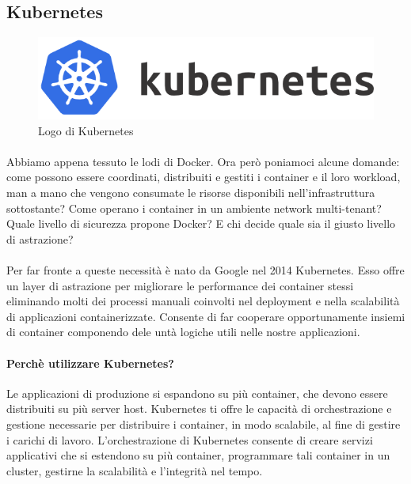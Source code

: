 \subsection{Kubernetes}
\begin{figure}[h!]
	\centering
	\includegraphics[width=\textwidth,keepaspectratio=true]{capitoli/imgs/kubernetes_full.png}
	\caption{Logo di Kubernetes}
\end{figure}

\paragraph{}
Abbiamo appena tessuto le lodi di Docker. Ora però poniamoci alcune domande: come possono essere coordinati, distribuiti e gestiti i container e il loro workload, man a mano che vengono consumate le risorse disponibili nell’infrastruttura sottostante? Come operano i container in un ambiente network multi-tenant? Quale livello di sicurezza propone Docker? E chi decide quale sia il giusto livello di astrazione?

\paragraph{}
Per far fronte a queste necessità è nato da Google nel 2014 Kubernetes. Esso offre un layer di astrazione per migliorare le performance dei container stessi eliminando molti dei processi manuali coinvolti nel deployment e nella scalabilità di applicazioni containerizzate. Consente di far cooperare opportunamente insiemi di container componendo dele untà logiche utili nelle nostre applicazioni.

\paragraph{Perchè utilizzare Kubernetes?}
Le applicazioni di produzione si espandono su più container, che devono essere distribuiti su più server host. Kubernetes ti offre le capacità di orchestrazione e gestione necessarie per distribuire i container, in modo scalabile, al fine di gestire i carichi di lavoro. L'orchestrazione di Kubernetes consente di creare servizi applicativi che si estendono su più container, programmare tali container in un cluster, gestirne la scalabilità e l'integrità nel tempo.

